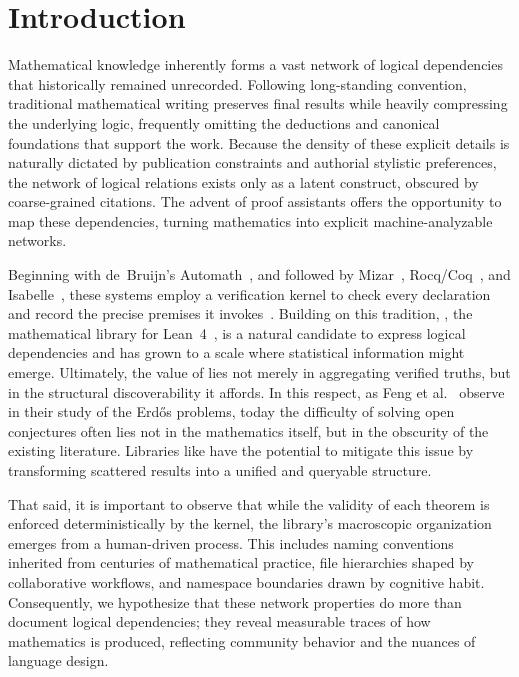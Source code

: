 \section{Introduction}
Mathematical knowledge inherently forms a vast network of logical dependencies that historically remained unrecorded. Following long-standing convention, traditional mathematical writing preserves final results while heavily compressing the underlying logic, frequently omitting the deductions and canonical foundations that support the work. Because the density of these explicit details is naturally dictated by publication constraints and authorial stylistic preferences, the network of logical relations exists only as a latent construct, obscured by coarse-grained citations. The advent of proof assistants offers the opportunity to map these dependencies, turning mathematics into explicit machine-analyzable networks.

Beginning with de~Bruijn's Automath~\cite{debruijn1970}, and followed by Mizar~\cite{trybulec1978}, Rocq/Coq~\cite{coquand1988}, and Isabelle~\cite{paulson1994}, these systems employ a verification kernel to check every declaration and record the precise premises it invokes~\cite{avigad2024}. Building on this tradition, , the mathematical library for Lean~4~\cite{mathlib2020,lean4}, is a natural candidate to express logical dependencies and has grown to a scale where statistical information might emerge.
Ultimately, the value of  lies not merely in aggregating verified truths, but in the structural discoverability it affords. In this respect, as Feng et al.~\cite{feng2026erdos} observe in their study of the Erd\H{o}s problems, today the difficulty of solving open conjectures often lies not in the mathematics itself, but in the obscurity of the existing literature. Libraries like  have the potential to mitigate this issue by transforming scattered results into a unified and queryable structure. 

That said, it is important to observe that while the validity of each theorem is enforced deterministically by the kernel, the library's macroscopic organization emerges from a human-driven process. This includes naming conventions inherited from centuries of mathematical practice, file hierarchies shaped by collaborative workflows, and namespace boundaries drawn by cognitive habit. Consequently, we hypothesize that these network properties do more than document logical dependencies; they reveal measurable traces of how mathematics is produced, reflecting community behavior and the nuances of language design.

